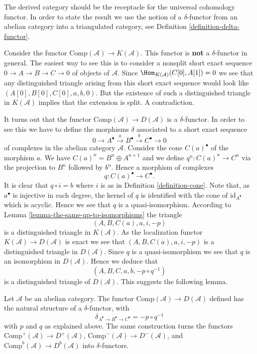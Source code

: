 \noindent
The derived category should be the receptacle for the universal
cohomology functor. In order to state the result we use
the notion of a $\delta$-functor from an abelian category
into a triangulated category, see
Definition \ref{definition-delta-functor}.

\medskip\noindent
Consider the functor
$\text{Comp}(\mathcal{A}) \to K(\mathcal{A})$.
This functor is {\bf not} a $\delta$-functor in general.
The easiest way to see this is to consider a nonsplit
short exact sequence $0 \to A \to B \to C \to 0$
of objects of $\mathcal{A}$. Since
$\Hom_{K(\mathcal{A})}(C[0], A[1]) = 0$
we see that any distinguished triangle arising from
this short exact sequence would look like
$(A[0], B[0], C[0], a, b, 0)$. But the existence of such a
distinguished triangle in $K(\mathcal{A})$ implies
that the extension is split. A contradiction.

\medskip\noindent
It turns out that the functor
$\text{Comp}(\mathcal{A}) \to D(\mathcal{A})$ is a
$\delta$-functor. In order to see this we have to define
the morphisms $\delta$ associated to a short exact sequence
$$
0 \to A^\bullet \xrightarrow{a} B^\bullet \xrightarrow{b} C^\bullet \to 0
$$
of complexes in the abelian category $\mathcal{A}$.
Consider the cone $C(a)^\bullet$ of the morphism $a$.
We have $C(a)^n = B^n \oplus A^{n + 1}$ and we define
$q^n : C(a)^n \to C^n$ via the projection to $B^n$ followed
by $b^n$. Hence a morphism of complexes
$$
q : C(a)^\bullet \longrightarrow C^\bullet.
$$
It is clear that $q \circ i = b$ where $i$ is as in
Definition \ref{definition-cone}.
Note that, as $a^\bullet$ is injective in each degree,
the kernel of $q$ is identified with the cone of
$\text{id}_{A^\bullet}$ which is acyclic. Hence we see that
$q$ is a quasi-isomorphism. According to
Lemma \ref{lemma-the-same-up-to-isomorphisms}
the triangle
$$
(A, B, C(a), a, i, -p)
$$
is a distinguished triangle in $K(\mathcal{A})$.
As the localization functor
$K(\mathcal{A}) \to D(\mathcal{A})$ is
exact we see that $(A, B, C(a), a, i, -p)$ is a distinguished
triangle in $D(\mathcal{A})$. Since $q$ is a quasi-isomorphism
we see that $q$ is an isomorphism in $D(\mathcal{A})$.
Hence we deduce that
$$
(A, B, C, a, b, -p \circ q^{-1})
$$
is a distinguished triangle of $D(\mathcal{A})$.
This suggests the following lemma.

\begin{lemma}
\label{lemma-derived-canonical-delta-functor}
Let $\mathcal{A}$ be an abelian category. The functor
$\text{Comp}(\mathcal{A}) \to D(\mathcal{A})$
defined has the natural structure of a $\delta$-functor,
with
$$
\delta_{A^\bullet \to B^\bullet \to C^\bullet} = - p \circ q^{-1}
$$
with $p$ and $q$ as explained above. The same construction turns the
functors
$\text{Comp}^{+}(\mathcal{A}) \to D^{+}(\mathcal{A})$,
$\text{Comp}^{-}(\mathcal{A}) \to D^{-}(\mathcal{A})$, and
$\text{Comp}^b(\mathcal{A}) \to D^b(\mathcal{A})$
into $\delta$-functors.
\end{lemma}

